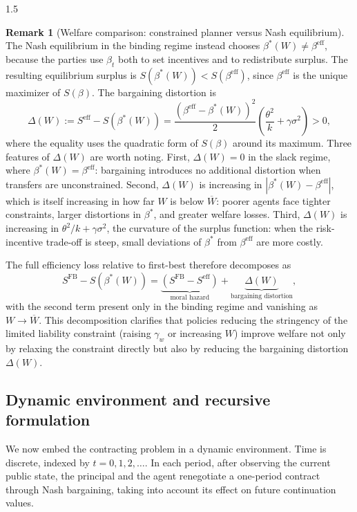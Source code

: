 \documentclass[12pt]{article}
\theoremstyle{definition}
\newtheorem{remark}{Remark}[section]
\theoremstyle{plain}
\begin{document}
\begin{spacing}{1.5}
\begin{remark}[Welfare comparison: constrained planner versus Nash equilibrium]
The Nash equilibrium in the binding regime instead chooses $\beta^*(W) \neq \beta^{\mathrm{eff}}$, because the parties use $\beta_t$ both to set incentives and to redistribute surplus. The resulting equilibrium surplus is $S(\beta^*(W)) < S(\beta^{\mathrm{eff}})$, since $\beta^{\mathrm{eff}}$ is the unique maximizer of $S(\beta)$. The bargaining distortion is
\[
\Delta(W) := S^{\mathrm{eff}} - S(\beta^*(W)) = \frac{(\beta^{\mathrm{eff}} - \beta^*(W))^2}{2} \left(\frac{\theta^2}{k} + \gamma\sigma^2\right) > 0,
\]
where the equality uses the quadratic form of $S(\beta)$ around its maximum. Three features of $\Delta(W)$ are worth noting. First, $\Delta(W) = 0$ in the slack regime, where $\beta^*(W) = \beta^{\mathrm{eff}}$: bargaining introduces no additional distortion when transfers are unconstrained. Second, $\Delta(W)$ is increasing in $|\beta^*(W) - \beta^{\mathrm{eff}}|$, which is itself increasing in how far $W$ is below $\overline{W}$: poorer agents face tighter constraints, larger distortions in $\beta^*$, and greater welfare losses. Third, $\Delta(W)$ is increasing in $\theta^2/k + \gamma\sigma^2$, the curvature of the surplus function: when the risk-incentive trade-off is steep, small deviations of $\beta^*$ from $\beta^{\mathrm{eff}}$ are more costly.

The full efficiency loss relative to first-best therefore decomposes as
\[
S^{\mathrm{FB}} - S(\beta^*(W)) = \underbrace{(S^{\mathrm{FB}} - S^{\mathrm{eff}})}_{\text{moral hazard}} + \underbrace{\Delta(W)}_{\text{bargaining distortion}},
\]
with the second term present only in the binding regime and vanishing as $W \to \overline{W}$. This decomposition clarifies that policies reducing the stringency of the limited liability constraint (raising $\gamma_w$ or increasing $W$) improve welfare not only by relaxing the constraint directly but also by reducing the bargaining distortion $\Delta(W)$.
\end{remark}

\subsection{Dynamic environment and recursive formulation}\label{subsec:dynamics}

We now embed the contracting problem in a dynamic environment. Time is discrete, indexed by $t=0,1,2,\dots$. In each period, after observing the current public state, the principal and the agent renegotiate a one-period contract through Nash bargaining, taking into account its effect on future continuation values.


\end{spacing}
\end{document}
